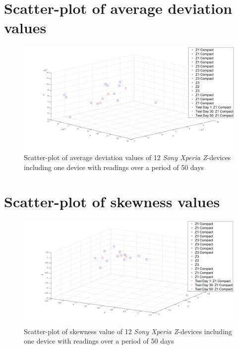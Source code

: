 \section*{Scatter-plot of average deviation values}
\begin{figure}[H]
	\centering
	\includegraphics[scale=.3]{img/features/avg_dev}
	\caption{Scatter-plot of average deviation values of 12  \textit{Sony Xperia Z}-devices including one device with readings over a period of 50 days}
	\label{fig:feature:avgdev}
\end{figure}

\section*{Scatter-plot of skewness values}
\begin{figure}[H]
	\centering
	\includegraphics[scale=.3]{img/features/skew}
	\caption{Scatter-plot of skewness value of 12  \textit{Sony Xperia Z}-devices including one device with readings over a period of 50 days}
	\label{fig:feature:skew}
\end{figure}

